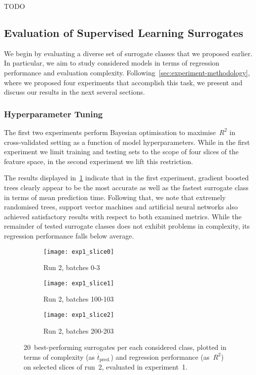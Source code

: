 TODO

\subsection{Evaluation of Supervised Learning Surrogates}
\label{sec:modelres}

We begin by evaluating a diverse set of surrogate classes that we proposed
earlier. In particular, we aim to study considered models in terms of regression
performance and evaluation complexity.
Following~\cref{sec:experiment-methodology}, where we proposed four experiments
that accomplish this task, we present and discuss our results in the next
several sections.


\subsubsection{Hyperparameter Tuning}

The first two experiments perform Bayesian optimisation to maximise~$R^2$ in
cross-validated setting as a function of model hyperparameters. While in the
first experiment we limit training and testing sets to the scope of four slices of the
feature space, in the second experiment we lift this restriction.

The results displayed in~\cref{fig:exp1-time-vs-reg} indicate that in the first
experiment, gradient boosted trees clearly appear to be the most accurate as
well as the fastest surrogate class in terms of mean prediction time. Following
that, we note that extremely randomised trees, support vector machines and
artificial neural networks also achieved satisfactory results with respect to both examined metrics.
While the remainder of tested surrogate classes does not exhibit problems in
complexity, its regression performance falls below average.

\begin{figure}[h]
	\centering
	\begin{subfigure}[b]{0.333\textwidth}
		\centering
		\texttt{[image: exp1\_slice0]}
		\caption{Run 2, batches 0-3}
	\end{subfigure}\hfill%
	\begin{subfigure}[b]{0.333\textwidth}
		\centering
		\texttt{[image: exp1\_slice1]}
		\caption{Run 2, batches 100-103}
	\end{subfigure}\hfill%
	\begin{subfigure}[b]{0.333\textwidth}
		\centering
		\texttt{[image: exp1\_slice2]}
		\caption{Run 2, batches 200-203}
	\end{subfigure}
	\caption{20~best-performing surrogates per each considered class, plotted in
		terms of complexity (as $\overline{t}_{\text{pred.}}$) and regression
		performance (as~$R^2$) on selected slices of run~2, evaluated in experiment~1.}
	\label{fig:exp1-time-vs-reg}
\end{figure}

